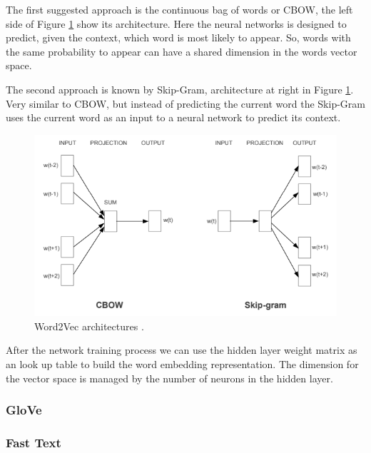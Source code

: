 	The first suggested approach is the continuous bag of words or CBOW, the left side of Figure \ref{fig:word2vecarchitectures} show its architecture. Here the neural networks is designed to predict, given the context, which word is most likely to appear. So, words with the same probability to appear can have a shared dimension in the words vector space. 

	The second approach is known by Skip-Gram, architecture at right in Figure \ref{fig:word2vecarchitectures}. Very similar to CBOW, but instead of predicting the current word the Skip-Gram uses the current word as an input to a neural network to predict its context.
	
	\begin{figure}[h!]
		\centering
		\includegraphics[width=0.85\linewidth]{01.Chapters/02.Background/word2vec_architectures}
		\caption{Word2Vec architectures \cite{mikolov2013efficient}.}
		\label{fig:word2vecarchitectures}
	\end{figure}
	
	
	After the network training process we can use the hidden layer weight matrix as an look up table to build the word embedding representation. The dimension for the vector space is managed by the number of neurons in the hidden layer. 		
	
	
	\subsubsection{GloVe}
	
	
	
	
	\subsubsection{Fast Text}
		
